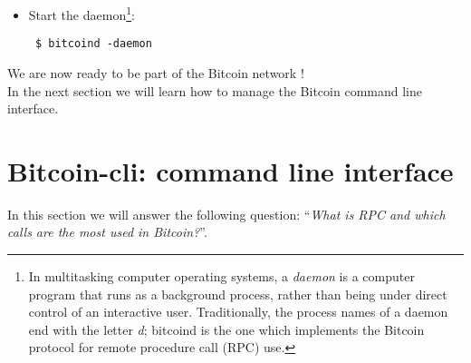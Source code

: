 \begin{itemize}
\bigskip
\noindent
First, create the directory you want to put your data into: \bigskip
\begin{lstlisting}
 $ /bin/mkdir ~username/.bitcoin
\end{lstlisting}
Then create the configuration file (as you need it):
\bigskip
\begin{lstlisting}
 $ cat >> ~username/.bitcoin/bitcoin.conf << EOF
 # Accept command line and JSON-RPC commands
 server=1
 # Username for JSON-RPC connections
 rpcuser=invent_a_username_here
 # Password for JSON-RPC connections
 rpcpassword=invent_a_long_pwd_here
 # Enable Testnet chain mode
 testnet=1
 EOF
\end{lstlisting}
The \textit{bitcoin.conf} file is the default file which Bitcoin daemon reads when launched, and it contains instructions to configure the node (e.g. mainnet, testnet or regtest mode). In this example we define a \textit{rpcuser} and \textit{rpcpassword} to enable RPC, and we tell the node to synchronize with the Bitcoin Testnet chain.

\bigskip
\noindent
Finally, limit the permissions to your configuration file (not really needed, but more secure): \bigskip
\begin{lstlisting}
 $ /bin/chmod 600 ~username/.bitcoin/bitcoin.conf
\end{lstlisting}
\item Start the daemon\footnote{In multitasking computer operating systems, a \textit{daemon} is a computer program that runs as a background process, rather than being under direct control of an interactive user. Traditionally, the process names of a daemon end with the letter \textit{d}; \colorbox{Grey!10}{bitcoind} is the one which implements the Bitcoin protocol for remote procedure call (RPC) use.}:
\bigskip
\begin{lstlisting}
 $ bitcoind -daemon
\end{lstlisting}
\end{itemize}
We are now ready to be part of the Bitcoin network ! \\ 
In the next section we will learn how to manage the Bitcoin command line interface.

\bigskip

\section{Bitcoin-cli: command line interface}
In this section we will answer the following question: \enquote{\textit{What is RPC and which calls are the most used in Bitcoin?}}.

